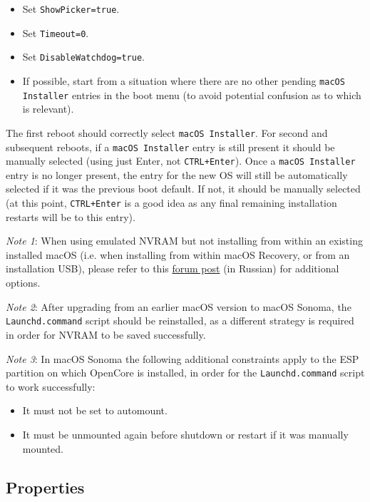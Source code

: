 \documentclass[]{article}
\providecommand{\tightlist}{%
  \setlength{\itemsep}{0pt}\setlength{\parskip}{0pt}}
\begin{document}
\begin{itemize}
\tightlist
 \item Set \texttt{ShowPicker=true}.
 \item Set \texttt{Timeout=0}.
 \item Set \texttt{DisableWatchdog=true}.
 \item If possible, start from a situation where there are no other pending \texttt{macOS Installer} entries in the boot menu
 (to avoid potential confusion as to which is relevant).
\end{itemize}

The first reboot should correctly select \texttt{macOS Installer}. For second and subsequent reboots, if a \texttt{macOS Installer}
entry is still present it should be manually selected (using just Enter, not \texttt{CTRL+Enter}). Once a \texttt{macOS Installer}
entry is no longer present, the entry for the new OS will still be automatically selected if it was the previous boot default.
If not, it should be manually selected (at this point, \texttt{CTRL+Enter} is a good idea as any final remaining installation restarts
will be to this entry).

\emph{Note 1}: When using emulated NVRAM but not installing from within an existing installed macOS (i.e. when installing from
within macOS Recovery, or from an installation USB), please refer to this
\href{https://applelife.ru/posts/916248}{forum post} (in Russian)
for additional options.

\emph{Note 2}: After upgrading from an earlier macOS version to macOS Sonoma, the \texttt{Launchd.command} script should be
reinstalled, as a different strategy is required in order for NVRAM to be saved successfully.

\emph{Note 3}: In macOS Sonoma the following additional constraints apply to the ESP partition on which
OpenCore is installed, in order for the \texttt{Launchd.command} script to work successfully:

\begin{itemize}
\tightlist
 \item It must not be set to automount.
 \item It must be unmounted again before shutdown or restart if it was manually mounted.
\end{itemize}

\subsection{Properties}\label{uefiprops}
\end{document}
